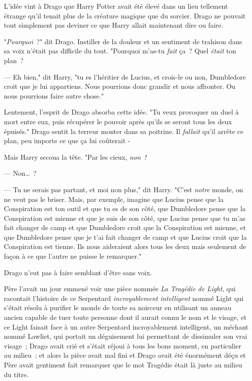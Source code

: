 L'idée vint à Drago que Harry Potter avait été élevé dans un lieu tellement étrange qu'il tenait plus de la créature magique que du sorcier. Drago ne pouvait tout simplement pas deviner ce que Harry allait maintenant dire ou faire.

"\emph{Pourquoi}~?" dit Drago. Instiller de la douleur et un sentiment de trahison dans sa voix n'était pas difficile du tout. "Pourquoi m'as-tu \emph{fait} ça~? Quel \emph{était} ton plan~?

--- Eh bien," dit Harry, "tu es l'héritier de Lucius, et crois-le ou non, Dumbledore croit que je lui appartiens. Nous pourrions donc grandir et nous affronter. Ou nous pourrions faire autre chose."

Lentement, l'esprit de Drago absorba cette idée. "Tu veux provoquer un duel à mort entre eux, puis récupérer le pouvoir après qu'ils se seront tous les deux épuisés." Drago sentit la terreur monter dans sa poitrine. Il \emph{fallait} qu'il arrête ce plan, peu importe ce que ça lui coûterait -

Mais Harry secoua la tête. "Par les cieux, \emph{non~!}

--- Non…~?

--- Tu ne serais pas partant, et moi non plus," dit Harry. "C'est \emph{notre} monde, on ne veut pas le briser. Mais, par exemple, imagine que Lucius pense que la Conspiration est ton outil et que tu es de son côté, que Dumbledore pense que la Conspiration est mienne et que je suis de son côté, que Lucius pense que tu m'as fait changer de camp et que Dumbledore croit que la Conspiration est mienne, et que Dumbledore pense que je t'ai fait changer de camp et que Lucius croit que la Conspiration est tienne. Ils nous aideraient alors tous les deux mais seulement de façon à ce que l'autre ne puisse le remarquer."

Drago n'eut pas à faire semblant d'être sans voix.

Père l'avait un jour emmené voir une pièce nommée \emph{La Tragédie de Light}, qui racontait l'histoire de ce Serpentard \emph{incroyablement intelligent} nommé Light qui s'était résolu à purifier le monde de toute sa noirceur en utilisant un anneau ancien capable de tuer toute personne dont il aurait connu le nom et le visage, et ce Light faisait face à un autre Serpentard incroyablement intelligent, un méchant nommé Lawliet, qui portait un déguisement lui permettant de dissimuler son vrai visage~; Drago avait crié et s'était réjoui à tous les bons moment, en particulier au milieu~; et alors la pièce avait mal fini et Drago avait été énormément déçu et Père avait gentiment fait remarquer que le mot Tragédie était là juste au milieu du titre.

